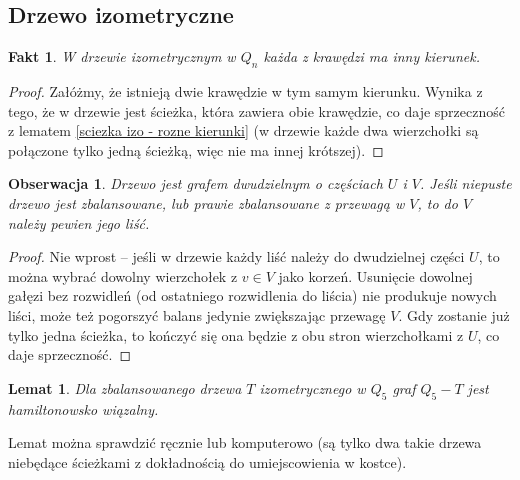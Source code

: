\documentclass{pracamgr}
\newtheorem{lemma}[theorem]{Lemat}
\newtheorem{observation}[theorem]{Obserwacja}
\newtheorem{fact}[theorem]{Fakt}
\begin{document}
   \subsection{Drzewo izometryczne}
    \begin{fact}\label{drzewo izo - kierunek tylko raz}
     W drzewie izometrycznym w $Q_n$ każda z krawędzi ma inny kierunek.
    \end{fact}
    \begin{proof}
     Załóżmy, że istnieją dwie krawędzie w tym samym kierunku. Wynika z tego, że w drzewie jest ścieżka,
     która zawiera obie krawędzie, co daje sprzeczność z lematem
     \ref{sciezka izo - rozne kierunki} (w drzewie każde dwa wierzchołki są połączone tylko jedną ścieżką, więc nie ma innej krótszej).
    \end{proof}
    \begin{observation}\label{drzewo izo zbal - ma liść z V}
     Drzewo jest grafem dwudzielnym o częściach $U$ i $V$. Jeśli niepuste drzewo jest zbalansowane, lub prawie zbalansowane z przewagą w $V$,
     to do $V$ należy pewien jego liść.
    \end{observation}
    \begin{proof}
     Nie wprost -- jeśli w drzewie każdy liść należy do dwudzielnej części $U$, to można wybrać dowolny wierzchołek z $v\in V$ jako korzeń.
     Usunięcie dowolnej gałęzi bez rozwidleń (od ostatniego rozwidlenia do liścia) nie produkuje nowych liści, może też pogorszyć balans jedynie
     zwiększając przewagę $V$. Gdy zostanie już tylko jedna ścieżka, to kończyć się ona będzie z obu stron wierzchołkami z $U$, co daje sprzeczność.
    \end{proof}
    \begin{lemma}\label{Q_5-izo tree hamilton}
     Dla zbalansowanego drzewa $T$ izometrycznego w $Q_5$ graf $Q_5-T$ jest hamiltonowsko wiązalny.
    \end{lemma}
    Lemat można sprawdzić ręcznie lub komputerowo (są tylko dwa takie drzewa niebędące ścieżkami z dokładnością do umiejscowienia w kostce).
\end{document}
